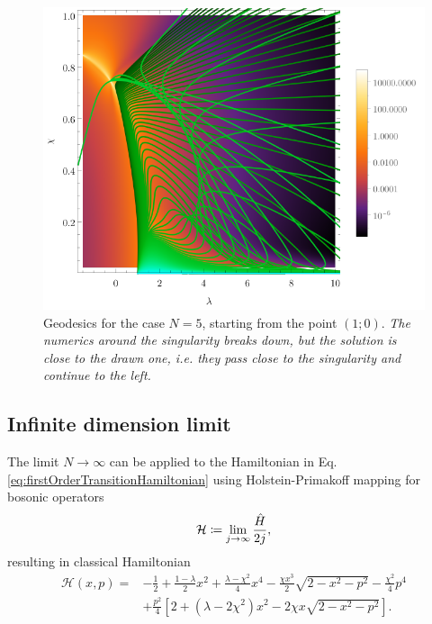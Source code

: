 \begin{figure}[H]
    \centering
    \includegraphics[scale=1.3]{../img/N=5_geods00.pdf}
    \caption{Geodesics for the case $N=5$, starting from the point $(1;0)$. \emph{The numerics around the singularity breaks down, but the solution is close to the drawn one, i.e. they pass close to the singularity and continue to the left.}}
    \label{fig:geod10}    
\end{figure}







\subsection{Infinite dimension limit}
The limit $N\rightarrow \infty$ can be applied to the Hamiltonian in Eq. \ref{eq:firstOrderTransitionHamiltonian} using Holstein-Primakoff mapping for bosonic operators
\begin{equation}
    \mathcal{H}\coloneqq\lim_{j\rightarrow\infty}\frac{\hat{H}}{2j},
\end{equation}
resulting in classical Hamiltonian
\begin{equation}
    \begin{split}
        \mathcal{H}(x,p)=&-\frac{1}{2}+\frac{1-\lambda}{2}x^2+\frac{\lambda-\chi^2}{4}x^4-\frac{\chi x^3}{2}\sqrt{2-x^2-p^2}-\frac{\chi^2}{4}p^4\\
        &+\frac{p^2}{4}\left[2+(\lambda-2\chi^2)x^2-2\chi x\sqrt{2-x^2-p^2}\right].
    \end{split}
    \label{eq:HamiltonianClassicalLimit}
\end{equation}


